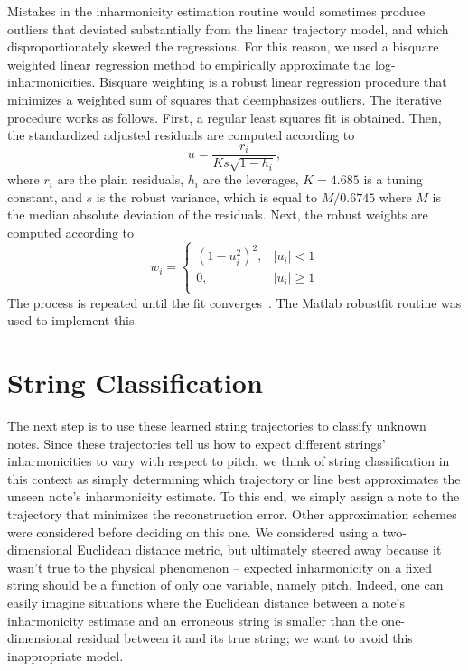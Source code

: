 \documentclass[12pt]{cmuthesis}
\begin{document}
Mistakes in the inharmonicity estimation routine would sometimes produce outliers that deviated substantially from the linear trajectory model, and which disproportionately skewed the regressions. For this reason, we used a bisquare weighted linear regression method to empirically approximate the log-inharmonicities. Bisquare weighting is a robust linear regression procedure that minimizes a weighted sum of squares that deemphasizes outliers. The iterative procedure works as follows. First, a regular least squares fit is obtained. Then, the standardized adjusted residuals are computed according to
\begin{equation}
u = \frac{r_i}{Ks\sqrt{1-h_i}},
\end{equation}
where $r_i$ are the plain residuals, $h_i$ are the leverages, $K = 4.685$ is a tuning constant, and $s$ is the robust variance, which is equal to $M/0.6745$ where $M$ is the median absolute deviation of the residuals. Next, the robust weights are computed according to
\begin{equation}
w_i = \begin{cases}
(1-u_i^2)^2, & |u_i| < 1\\
0, & |u_i| \geq 1\\
\end{cases}
\end{equation} 
The process is repeated until the fit converges~\cite{matlab}. The Matlab robustfit routine was used to implement this.

\section{String Classification}
The next step is to use these learned string trajectories to classify unknown notes. Since these trajectories tell us how to expect different strings' inharmonicities to vary with respect to pitch, we think of string classification in this context as simply determining which trajectory or line best approximates the unseen note's inharmonicity estimate. To this end, we simply assign a note to the trajectory that minimizes the reconstruction error. Other approximation schemes were considered before deciding on this one. We considered using a two-dimensional Euclidean distance metric, but ultimately steered away because it wasn't true to the physical phenomenon -- expected inharmonicity on a fixed string should be a function of only one variable, namely pitch. Indeed, one can easily imagine situations where the Euclidean distance between a note's inharmonicity estimate and an erroneous string is smaller than the one-dimensional residual between it and its true string; we want to avoid this inappropriate model. 
\end{document}
